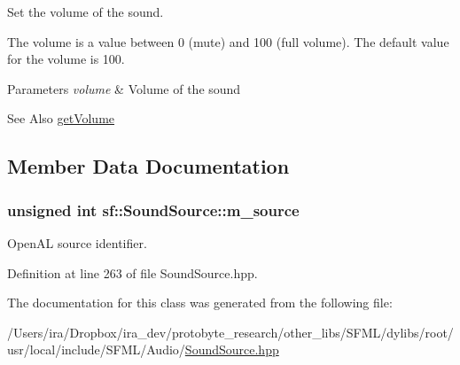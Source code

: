 Set the volume of the sound. 

The volume is a value between 0 (mute) and 100 (full volume). The default value for the volume is 100.


\begin{DoxyParams}{Parameters}
{\em volume} & Volume of the sound\\
\hline
\end{DoxyParams}
\begin{DoxySeeAlso}{See Also}
\hyperlink{classsf_1_1_sound_source_aafb0558fce9cbebfc6828d932cbcce2f}{get\-Volume} 
\end{DoxySeeAlso}


\subsection{Member Data Documentation}
\hypertarget{classsf_1_1_sound_source_a0223cef4b1c587e6e1e17b4c92c4479c}{
\subsubsection[{m\-\_\-source}]{\setlength{\rightskip}{0pt plus 5cm}unsigned int sf\-::\-Sound\-Source\-::m\-\_\-source\hspace{0.3cm}{\ttfamily [protected]}}}\label{classsf_1_1_sound_source_a0223cef4b1c587e6e1e17b4c92c4479c}


Open\-A\-L source identifier. 



Definition at line 263 of file Sound\-Source.\-hpp.



The documentation for this class was generated from the following file\-:\begin{DoxyCompactItemize}
\item 
/\-Users/ira/\-Dropbox/ira\-\_\-dev/protobyte\-\_\-research/other\-\_\-libs/\-S\-F\-M\-L/dylibs/root/usr/local/include/\-S\-F\-M\-L/\-Audio/\hyperlink{_sound_source_8hpp}{Sound\-Source.\-hpp}\end{DoxyCompactItemize}
